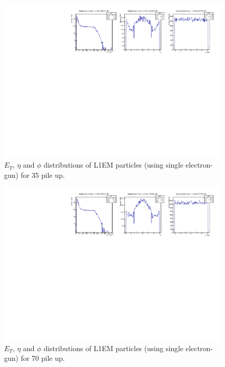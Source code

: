 \begin{figure}[!htb]
  \centering
  \includegraphics[scale=0.8]{../SimulationTools/L1EM_EtEtaPhi_35PileUP.pdf}
  \caption{$E_{T}$, $\eta$ and $\phi$ distributions of L1EM particles (using single electron-gun) for 35 pile up.}
  \label{}
\end{figure}

\begin{figure}[!htb]
  \centering
  \includegraphics[scale=0.8]{../SimulationTools/L1EM_EtEtaPhi_70PileUP.pdf}
  \caption{$E_{T}$, $\eta$ and $\phi$ distributions of L1EM particles (using single electron-gun) for 70 pile up.}
  \label{}
\end{figure}

